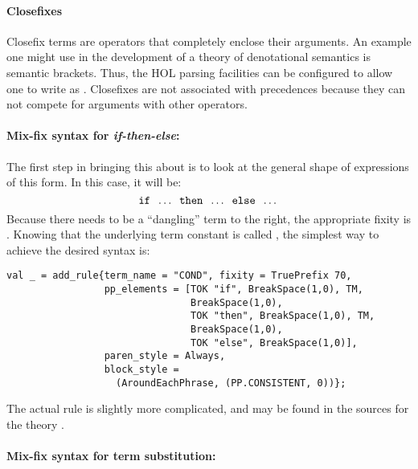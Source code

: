 {\paragraph{Closefixes}

Closefix terms are operators that completely enclose their arguments.
An example one might use in the development of a theory of
denotational semantics is semantic brackets.  Thus, the HOL parsing
facilities can be configured to allow one to write 
as \holtxt{[| x |]}.  Closefixes are not associated with precedences
because they can not compete for arguments with other operators.

\paragraph{Mix-fix syntax for {\it if-then-else}:}

The first step in bringing this about is to look at the general shape
of expressions of this form.  In this case, it will be:
%
\[
  \holtxt{if}\;\; \dots \;\;\holtxt{then}\;\;\dots\;\;
  \holtxt{else}\;\;\dots
  \]
%
 Because there needs to be a ``dangling'' term to the right, the
  appropriate fixity is .  Knowing that the underlying
  term constant is called , the simplest way to achieve
  the desired syntax is:

\begin{verbatim}
val _ = add_rule{term_name = "COND", fixity = TruePrefix 70,
                 pp_elements = [TOK "if", BreakSpace(1,0), TM,
                                BreakSpace(1,0),
                                TOK "then", BreakSpace(1,0), TM,
                                BreakSpace(1,0),
                                TOK "else", BreakSpace(1,0)],
                 paren_style = Always,
                 block_style =
                   (AroundEachPhrase, (PP.CONSISTENT, 0))};
\end{verbatim}
\noindent The actual rule is slightly more complicated, and
may be found in the sources for the theory .

\paragraph{Mix-fix syntax for term substitution:}

}
